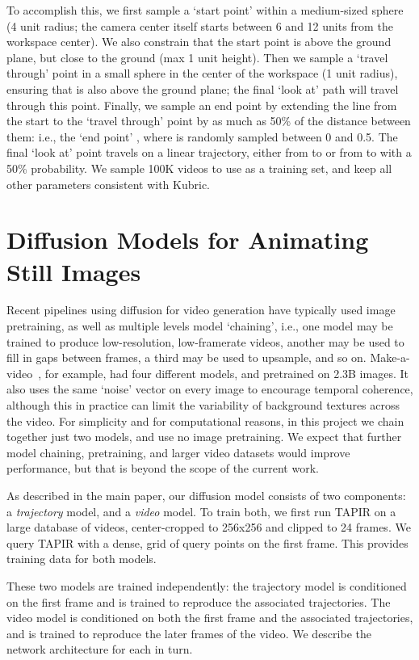 \documentclass[10pt,twocolumn,letterpaper]{article}
\begin{document}
To accomplish this, we first sample a `start point'  within a medium-sized sphere (4 unit radius; the camera center itself starts between 6 and 12 units from the workspace center).  We also constrain that the start point  is above the ground plane, but close to the ground (max 1 unit height).  Then we sample a `travel through' point  in a small sphere in the center of the workspace (1 unit radius), ensuring that  is also above the ground plane; the final `look at' path will travel through this point. Finally, we sample an end point by extending the line from the start to the `travel through' point by as much as 50\% of the distance between them: i.e., the `end point' , where  is randomly sampled between 0 and 0.5.  The final `look at' point travels on a linear trajectory, either from  to  or from  to  with a 50\% probability.  We sample 100K videos to use as a training set, and keep all other parameters consistent with Kubric.


\section{Diffusion Models for Animating Still Images}

Recent pipelines using diffusion for video generation have typically used image pretraining, as well as multiple levels model `chaining', i.e., one model may be trained to produce low-resolution, low-framerate videos, another may be used to fill in gaps between frames, a third may be used to upsample, and so on.  Make-a-video~\cite{singer2022make}, for example, had four different models, and pretrained on 2.3B images.  It also uses the same `noise' vector on every image to encourage temporal coherence, although this in practice can limit the variability of background textures across the video.  For simplicity and for computational reasons, in this project we chain together just two models, and use no image pretraining.  We expect that further model chaining, pretraining, and larger video datasets would improve performance, but that is beyond the scope of the current work.  

As described in the main paper, our diffusion model consists of two components: a \emph{trajectory} model, and a \emph{video} model.  To train both, we first run TAPIR on a large database of videos, center-cropped to 256x256 and clipped to 24 frames.  We query TAPIR with a dense,  grid of query points on the first frame.  This provides training data for both models.

These two models are trained independently: the trajectory model is conditioned on the first frame and is trained to reproduce the associated trajectories.  The video model is conditioned on both the first frame and the associated trajectories, and is trained to reproduce the later frames of the video.  We describe the network architecture for each in turn.
\end{document}
